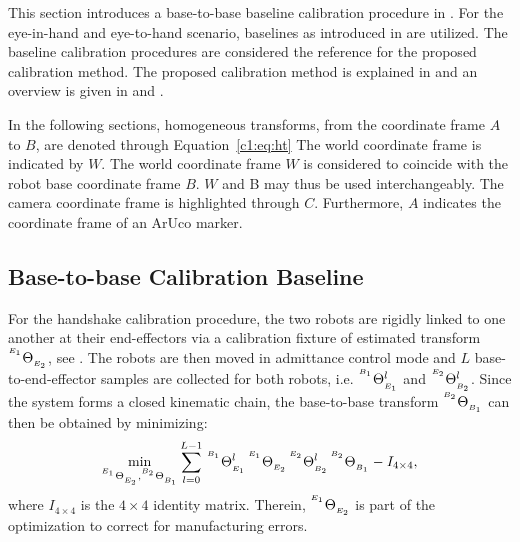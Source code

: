 This section introduces a base-to-base baseline calibration procedure in . For the eye-in-hand and eye-to-hand scenario, baselines as introduced in  are utilized. The baseline calibration procedures are considered the reference for the proposed calibration method. The proposed calibration method is explained in  and an overview is given in  and .

In the following sections, homogeneous transforms, from the coordinate frame $A$ to $B$, are denoted through Equation~\ref{c1:eq:ht}
The world coordinate frame is indicated by $W$. The world coordinate frame $W$ is considered to coincide with the robot base coordinate frame $B$. $W$ and B may thus be used interchangeably. The camera coordinate frame is highlighted through $C$. Furthermore, $A$ indicates the coordinate frame of an ArUco marker.

\subsection{Base-to-base Calibration Baseline}
\label{c1:sec:handshake_calibration}
For the handshake calibration procedure, the two robots are rigidly linked to one another at their end-effectors via a calibration fixture of estimated transform ${}^{^{E_1}}\Theta_{_{E_2}}$, see . The robots are then moved in admittance control mode and $L$ base-to-end-effector samples are collected for both robots, i.e. ${}^{^{B_1}}\Theta_{_{E_1}}^l$ and ${}^{^{E_2}}\Theta_{_{B_2}}^l$. Since the system forms a closed kinematic chain, the base-to-base transform ${}^{^{B_2}}\Theta_{_{B_1}}$ can then be obtained by minimizing:
%
\begin{equation}
    \label{c1:eq:handsake}
    \min_{{}^{^{E_1}}\Theta_{_{E_2}}, {}^{^{B_2}}\Theta_{_{B_1}}} \sum_{l=0}^{L-1}\,{}^{^{B_1}}\Theta_{_{E_1}}^l\,{}^{^{E_1}}\Theta_{_{E_2}}\,{}^{^{E_2}}\Theta_{_{B_2}}^l\,{}^{^{B_2}}\Theta_{_{B_1}} - I_{4\times4},
\end{equation}
%
where $I_{4\times4}$ is the $4\times4$ identity matrix. Therein, ${}^{^{E_1}}\Theta_{_{E_2}}$ is part of the optimization to correct for manufacturing errors.

